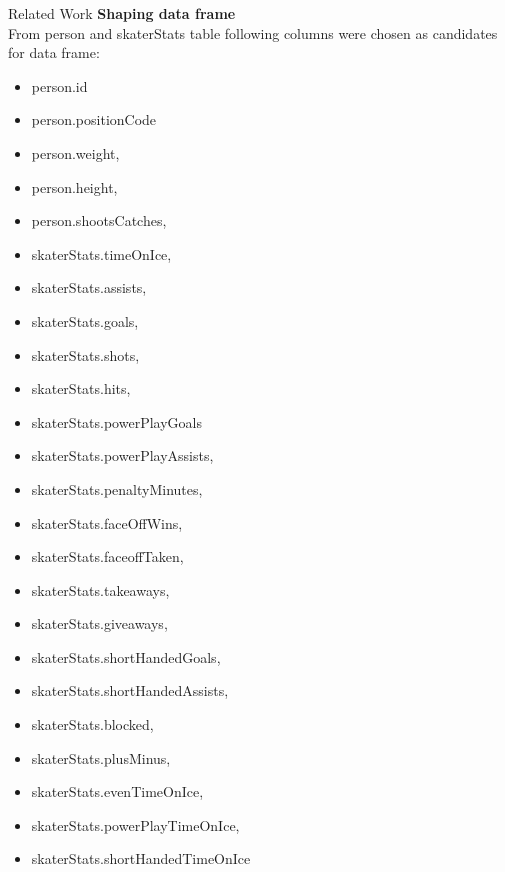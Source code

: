\begin{frame}{Related Work}
    \textbf{Shaping data frame}\\
    \vspace{2em}
    From person and skaterStats table following columns were chosen as candidates for data frame:\\
    \begin{minipage}[t]{0.45\textwidth}
        \begin{itemize}
            \item person.id
            \item person.positionCode
            \item person.weight,
            \item person.height,
            \item person.shootsCatches,
            \item skaterStats.timeOnIce,
            \item skaterStats.assists,
            \item skaterStats.goals,
            \item skaterStats.shots,
            \item skaterStats.hits,
            \item skaterStats.powerPlayGoals
            \item skaterStats.powerPlayAssists,
        \end{itemize}
    \end{minipage}
    \begin{minipage}[t]{0.45\textwidth}
        \begin{itemize}
            \item skaterStats.penaltyMinutes,
            \item skaterStats.faceOffWins,
            \item skaterStats.faceoffTaken,
            \item skaterStats.takeaways,
            \item skaterStats.giveaways,
            \item skaterStats.shortHandedGoals,
            \item skaterStats.shortHandedAssists,
            \item skaterStats.blocked,
            \item skaterStats.plusMinus,
            \item skaterStats.evenTimeOnIce,
            \item skaterStats.powerPlayTimeOnIce,
            \item skaterStats.shortHandedTimeOnIce
        \end{itemize}
    \end{minipage}
\end{frame}
